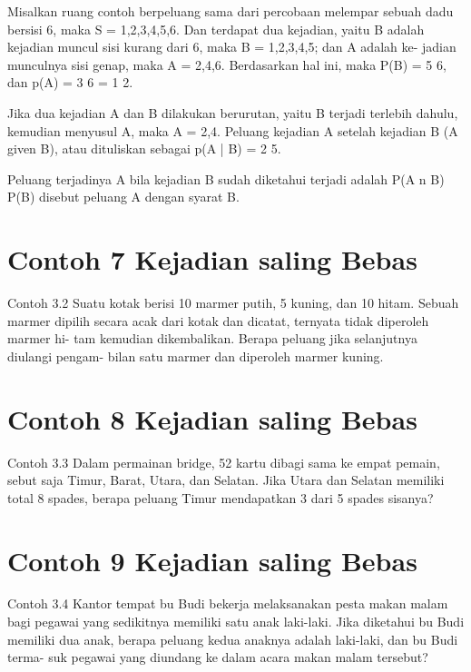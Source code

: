 \documentclass[11pt,fleqn]{book} %
\begin{document}
{{Misalkan ruang contoh berpeluang sama dari percobaan melempar sebuah dadu bersisi 6, maka S = {1,2,3,4,5,6}. Dan terdapat dua kejadian, yaitu B adalah kejadian muncul sisi kurang dari 6, maka B = {1,2,3,4,5}; dan A adalah ke- jadian munculnya sisi genap, maka A = {2,4,6}. Berdasarkan hal ini, maka P(B) = 5 6, dan p(A) = 3 6 = 1 2.

\vspace{0.5in}                                                                                                                         

Jika dua kejadian A dan B dilakukan berurutan, yaitu B terjadi terlebih dahulu, kemudian menyusul A, maka A = {2,4}. Peluang kejadian A setelah kejadian B (A given B), atau dituliskan sebagai p(A | B) = 2 5.


\vspace{0.5in}                                                                                                                         

Peluang terjadinya A bila kejadian B sudah diketahui terjadi adalah
P(A n B) P(B)
disebut peluang A dengan syarat B.

\vspace{0.5in}

\section{Contoh 7 Kejadian saling Bebas}
Contoh 3.2 Suatu kotak berisi 10 marmer putih, 5 kuning, dan 10 hitam. Sebuah marmer dipilih secara acak dari kotak dan dicatat, ternyata tidak diperoleh marmer hi- tam kemudian dikembalikan. Berapa peluang jika selanjutnya diulangi pengam- bilan satu marmer dan diperoleh marmer kuning.
\vspace{0.5in}
\section{Contoh 8 Kejadian saling Bebas}
Contoh 3.3 Dalam permainan bridge, 52 kartu dibagi sama ke empat pemain, sebut saja Timur, Barat, Utara, dan Selatan. Jika Utara dan Selatan memiliki total 8 spades, berapa peluang Timur mendapatkan 3 dari 5 spades sisanya?
\vspace{0.5in}
\section{Contoh 9 Kejadian saling Bebas}
Contoh 3.4 Kantor tempat bu Budi bekerja melaksanakan pesta makan malam bagi pegawai yang sedikitnya memiliki satu anak laki-laki. Jika diketahui bu Budi memiliki dua anak, berapa peluang kedua anaknya adalah laki-laki, dan bu Budi terma- suk pegawai yang diundang ke dalam acara makan malam tersebut?
\vspace{0.5in}
}}
\end{document}
